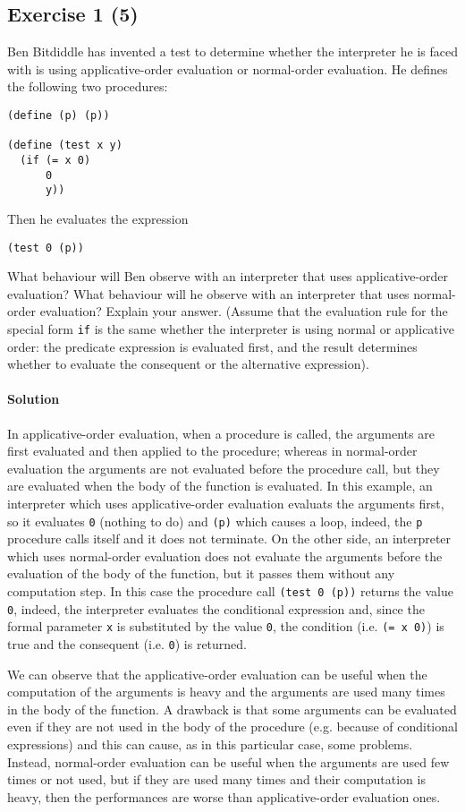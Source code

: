 \subsection*{Exercise 1 (5)}
Ben Bitdiddle has invented a test to determine whether the interpreter he is faced with is using applicative-order evaluation 
or normal-order evaluation. He defines the following two procedures:

\begin{lstlisting}
(define (p) (p))

(define (test x y)
  (if (= x 0)
      0
      y))
\end{lstlisting}

Then he evaluates the expression

\begin{lstlisting}
(test 0 (p))
\end{lstlisting}

What behaviour will Ben observe with an interpreter that uses applicative-order evaluation? What behaviour will he
observe with an interpreter that uses normal-order evaluation? Explain your answer. (Assume that the evaluation
rule for the special form \texttt{if} is the same whether the interpreter is using normal or applicative order: the predicate 
expression is evaluated first, and the result determines whether to evaluate the consequent or the alternative expression).

\paragraph{Solution}
In applicative-order evaluation, when a procedure is called, the arguments are first evaluated and then applied to the
procedure; whereas in normal-order evaluation the arguments are not evaluated before the procedure call, but they are evaluated
when the body of the function is evaluated.
In this example, an interpreter which uses applicative-order evaluation evaluats the arguments first, so it evaluates \texttt{0} 
(nothing to do) and \texttt{(p)} which causes a loop, indeed, the \texttt{p} procedure calls itself and it does not terminate.
On the other side, an interpreter which uses normal-order evaluation does not evaluate the arguments before the evaluation of
the body of the function, but it passes them without any computation step. In this case the procedure call \texttt{(test 0 (p))}
returns the value \texttt{0}, indeed, the interpreter evaluates the conditional expression and, since the formal parameter \texttt{x}
is substituted by the value \texttt{0}, the condition (i.e. \texttt{(= x 0)}) is true and the consequent (i.e. \texttt{0}) is returned.

We can observe that the applicative-order evaluation can be useful when the computation of the arguments is heavy and the arguments are
used many times in the body of the function. A drawback is that some arguments can be evaluated even if they are not used in the body of the
procedure (e.g. because of conditional expressions) and this can cause, as in this particular case, some problems.
Instead, normal-order evaluation can be useful when the arguments are used few times or not used, but if they are used many times 
and their computation is heavy, then the performances are worse than applicative-order evaluation ones.